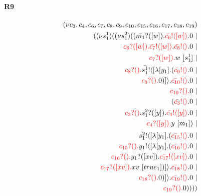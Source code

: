 \documentclass{article}
\begin{document}
\paragraph{R9}
\begin{align*}
 (\nu c_{3},c_{4},c_{6},c_{7},c_{8},c_{9},c_{10},c_{15},c_{16},c_{17},c_{18},c_{19}) \\ ( (\nu s^{1}_{1})( (\nu s^{2}_{1})((\color{black}\bar{m_{1}}?([w]).\color{black}\color{red}\bar{c_{6}}! \langle [w] \rangle \color{black}.0  \ | \\ \color{red}c_{6}?([w]).\color{black}\color{red}\bar{c_{7}}! \langle [w] \rangle \color{black}.\color{red}\bar{c_{8}}! \langle  \rangle \color{black}.0  \ | \\ \color{red}c_{7}?([w]).\color{black}w \ [s^{1}_{1}] \ | \\ \color{red}c_{8}?().\color{black}\color{black}\bar{s^{1}_{1}}! \langle [ \lambda [y_{1}].(\color{red}\bar{c_{9}}! \langle  \rangle \color{black}.0  \ | \\ \color{red}c_{9}?().\color{black}0 )] \rangle \color{black}.\color{red}\bar{c_{10}}! \langle  \rangle \color{black}.0  \ | \\ \color{red}c_{10}?().\color{black}0  \ | \\ (\color{red}\bar{c_{3}}! \langle  \rangle \color{black}.0  \ | \\ \color{red}c_{3}?().\color{black}\color{black}s^{2}_{1}?([y]).\color{black}\color{red}\bar{c_{4}}! \langle [y] \rangle \color{black}.0  \ | \\ \color{red}c_{4}?([y]).\color{black}y \ [m_{1}]) \ | \\ \color{black}\bar{s^{2}_{1}}! \langle [ \lambda [y_{1}].(\color{red}\bar{c_{15}}! \langle  \rangle \color{black}.0  \ | \\ \color{red}c_{15}?().\color{black}\color{black}y_{1}! \langle [ \lambda [y_{1}].(\color{red}\bar{c_{16}}! \langle  \rangle \color{black}.0  \ | \\ \color{red}c_{16}?().\color{black}\color{black}y_{1}?([xv]).\color{black}\color{red}\bar{c_{17}}! \langle [xv] \rangle \color{black}.0  \ | \\ \color{red}c_{17}?([xv]).\color{black}xv \ [true_{1}])] \rangle \color{black}.\color{red}\bar{c_{18}}! \langle  \rangle \color{black}.0  \ | \\ \color{red}c_{18}?().\color{black}0 )] \rangle \color{black}.\color{red}\bar{c_{19}}! \langle  \rangle \color{black}.0  \ | \\ \color{red}c_{19}?().\color{black}0 ))))
\end{align*}
\end{document}
